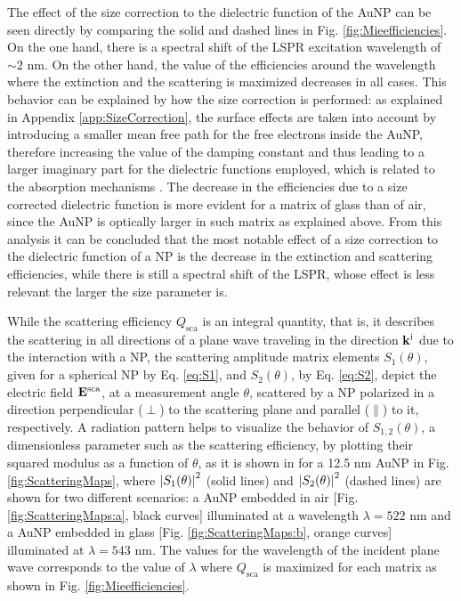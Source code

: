 The effect of the size correction to the dielectric function of the AuNP can be seen directly by comparing the solid and dashed lines in Fig. \ref{fig:Mieefficiencies}. On the one hand, there is a spectral shift of the LSPR excitation wavelength  of $\sim 2$ nm. On the other hand, the value of the efficiencies around the wavelength where the extinction and the scattering is maximized decreases in all cases.  This behavior can be explained by how the size correction is performed: as explained in Appendix \ref{app:SizeCorrection}, the surface effects are taken into account by introducing a smaller mean free path for the free electrons inside the AuNP, therefore increasing the value of the damping constant and thus leading to a larger imaginary part for the dielectric functions employed, which is related to the absorption mechanisms \cite{ibach_solid-state_2009}. The decrease in the efficiencies due to a size corrected dielectric function is more evident for a matrix of glass than of air, since the AuNP is optically larger in such matrix as explained above.  From this analysis it can be concluded that the most notable effect of a size correction to the dielectric function of a NP is the decrease in the extinction and scattering efficiencies, while there is still a spectral shift of the LSPR, whose effect is less relevant the larger the size parameter is.

While the scattering efficiency $Q_\text{sca}$ is an integral quantity, that is, it describes the scattering in all directions of a plane wave traveling in the  direction $\vb{k}^\text{i}$ due to the interaction with a NP, the scattering amplitude matrix elements $S_1(\theta)$,  given  for a spherical NP by Eq. \eqref{eq:S1}, and  $S_2(\theta)$, by Eq. \eqref{eq:S2}, depict the  electric field $\vb{E}^\text{sca}$, at a measurement angle $\theta$,  scattered by a NP polarized in a direction perpendicular ($\perp$) to the scattering plane and parallel ($\parallel$) to it, respectively. A radiation pattern helps to visualize the behavior of $S_{1,2}(\theta)$, a dimensionless parameter such as the scattering efficiency, by plotting their squared modulus as a function of $\theta$, as it is shown in for a 12.5 nm AuNP in Fig. \ref{fig:ScatteringMaps}, where $\abs{S_{1}(\theta)}^2$ (solid lines) and $\abs{S_2(\theta)}^2$ (dashed lines) are shown for two different scenarios: a AuNP embedded in air [Fig. \ref{fig:ScatteringMaps:a}, black curves]  illuminated  at a wavelength $\lambda = 522$ nm and a AuNP embedded in glass  [Fig. \ref{fig:ScatteringMaps:b}, orange curves]  illuminated at $\lambda = 543$ nm. The values for the wavelength of the incident plane wave corresponds to the value of $\lambda$ where $Q_\text{sca}$ is maximized for each matrix as shown in Fig. \ref{fig:Mieefficiencies}.

